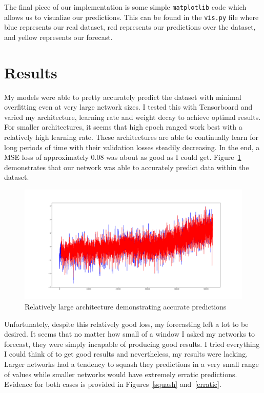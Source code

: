 \documentclass[letterpaper,12pt]{article}
\theoremstyle{plain}
\theoremstyle{definition}
\newcounter{r}
\newcommand\tx[1]{\texttt{#1}}
\begin{document}
The final piece of our implementation is some simple \tx{matplotlib} code which
allows us to visualize our predictions. This can be found in the \tx{vis.py}
file where blue represents our real dataset, red represents our predictions
over the dataset, and yellow represents our forecast.

\section{Results}

My models were able to pretty accurately predict the dataset with minimal
overfitting even at very large network sizes. I tested this with Tensorboard
and varied my architecture, learning rate and weight decay to achieve optimal
results. For smaller architectures, it seems that high epoch ranged work best
with a relatively high learning rate. These architectures are able to
continually learn for long periods of time with their validation losses
steadily decreasing. In the end, a MSE loss of approximately $0.08$ was about
as good as I could get. Figure~\ref{accurate} demonstrates that our network was
able to accurately predict data within the dataset.

\begin{figure}[ht]
  \begin{center}
    \includegraphics[scale=0.27]{accurate_predictions.png}
    \caption{Relatively large architecture demonstrating accurate predictions}
    \label{accurate}
  \end{center}
\end{figure}

Unfortunately, despite this relatively good loss, my forecasting left a lot to
be desired. It seems that no matter how small of a window I asked my networks
to forecast, they were simply incapable of producing good results. I tried
everything I could think of to get good results and nevertheless, my results
were lacking. Larger networks had a tendency to squash they predictions in a
very small range of values while smaller networks would have extremely erratic
predictions. Evidence for both cases is provided in Figures~\ref{squash}
and~\ref{erratic}.
\end{document}
